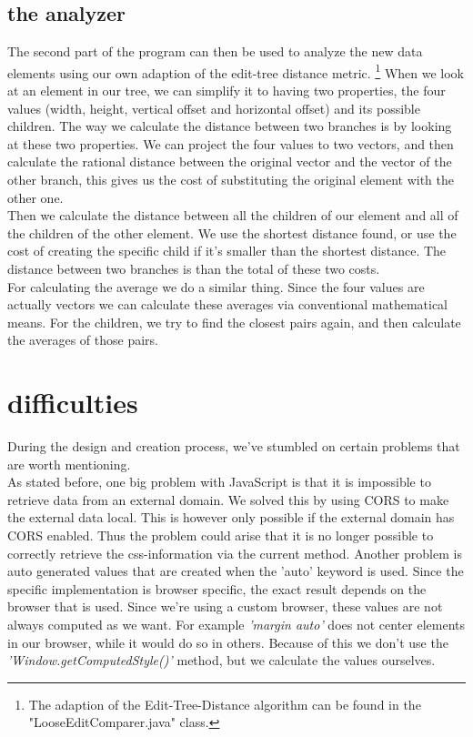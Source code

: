 \subsection{the analyzer}
The second part of the program can then be used to analyze the new data elements using our own adaption of the edit-tree distance metric.
\footnote{The adaption of the Edit-Tree-Distance algorithm can be found in the "LooseEditComparer.java" class.}
When we look at an element in our tree, we can simplify it to having two properties, the four values (width, height, vertical offset and horizontal offset) and its possible children. The way we calculate the distance between two branches is by looking at these two properties. We can project the four values to two vectors, and then calculate the rational distance between the original vector and the vector of the other branch, this gives us the cost of substituting the original element with the other one.\\
Then we calculate the distance between all the children of our element and all of the children of the other element. We use the shortest distance found, or use the cost of creating the specific child if it's smaller than the shortest distance. The distance between two branches is than the total of these two costs.\\
For calculating the average we do a similar thing. Since the four values are actually vectors we can calculate these averages via conventional mathematical means. For the children, we try to find the closest pairs again, and then calculate the averages of those pairs.

\section{difficulties}
During the design and creation process, we've stumbled on certain problems that are worth mentioning.\\
As stated before, one big problem with JavaScript is that it is impossible to retrieve data from an external domain. We solved this by using CORS to make the external data local. This is however only possible if the external domain has CORS enabled. Thus the problem could arise that it is no longer possible to correctly retrieve the css-information via the current method.
Another problem is auto generated values that are created when the 'auto' keyword is used. Since the specific implementation is browser specific, the exact result depends on the browser that is used. Since we're using a custom browser, these values are not always computed as we want. For example \textit{'margin auto'} does not center elements in our browser, while it would do so in others. Because of this we don't use the \textit{'Window.getComputedStyle()'} method, but we calculate the values ourselves. 
